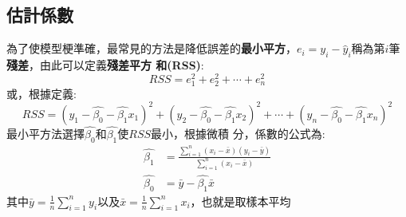 \documentclass{report} %
\begin{document}
    \subsection{估計係數}
      為了使模型梗準確，最常見的方法是降低誤差的{\bf 最小平方}，$e_i = y_i - \hat{y}_i$稱為第$i$筆{\bf
        殘差}，由此可以定義{\bf 殘差平方
        和(RSS)}:
      \[
        RSS = e_1 ^ 2 + e_2 ^ 2 + \cdots + e_n ^ 2
      \]
      或，根據定義:
      \begin{equation}
        RSS = (y_1 - \hat{\beta_0} - \hat{\beta_1}x_1) ^ 2 + (y_2 -
          \hat{\beta_0} - \hat{\beta_1}x_2) ^ 2 + \cdots + (y_n -
          \hat{\beta_0} - \hat{\beta_1}x_n) ^ 2
      \end{equation}
      最小平方法選擇$\hat{\beta_0}$和$\hat{\beta_1}$使$RSS$最小，根據微積
        分，係數的公式為:
      \begin{equation}
        \begin{split}
          \hat{\beta_1} & = \frac{\sum_{i = 1} ^ {n}(x_i -
            \bar{x})(y_i - \bar{y})}{\sum_{i = 1} ^ {n}(x_i -
            \bar{x})} \\
          \hat{\beta_0} & = \bar{y} - \hat{\beta_1}\bar{x}
        \end{split}
      \end{equation}
      其中$\bar{y} = \frac{1}{n}{\sum_{i = 1} ^ {n}y_i}$以及$\bar{x} =
        \frac{1}{n}\sum_{i = 1} ^ {n}x_i$，也就是取樣本平均
\end{document}
